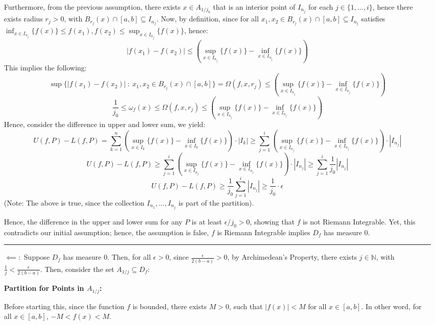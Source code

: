 \documentclass{article}
\begin{document}
\begin{itemize}
    Furthermore, from the previous assumption, there exists $x\in A_{1/j_0}$ that is an interior point of $I_{n_j}$ for each $j\in\{1,...,i\}$,
    hence there exists radius $r_j>0$, with $B_{r_j}(x)\cap [a,b]\subseteq I_{n_j}$.
    Now, by definition, since for all $x_1,x_2\in B_{r_j}(x)\cap [a,b]\subseteq I_{n_j}$ satisfies $\inf_{x\in I_{n_j}}\{f(x)\}\leq f(x_1),f(x_2)\leq \sup_{x\in I_{n_j}}\{f(x)\}$, hence:
    $$|f(x_1)-f(x_2)|\leq \left(\sup_{x\in I_{n_j}}\{f(x)\}-\inf_{x\in I_{n_j}}\{f(x)\}\right)$$
    This implies the following: 
    $$\sup\{|f(x_1)-f(x_2)|\ :\ x_1,x_2\in B_{r_j}(x)\cap [a,b]\}=\Omega(f,x,r_j)\leq \left(\sup_{x\in I_{n_j}}\{f(x)\}-\inf_{x\in I_{n_j}}\{f(x)\}\right)$$
    $$\frac{1}{j_0}\leq \omega_f(x)\leq \Omega(f,x,r_j)\leq \left(\sup_{x\in I_{n_j}}\{f(x)\}-\inf_{x\in I_{n_j}}\{f(x)\}\right)$$
    Hence, consider the difference in upper and lower sum, we yield:
    $$U(f,P)-L(f,P)=\sum_{k=1}^{n}\left(\sup_{x\in I_{k}}\{f(x)\}-\inf_{x\in I_{k}}\{f(x)\}\right)\cdot |I_k| \geq \sum_{j=1}^{i}\left(\sup_{x\in I_{n_j}}\{f(x)\}-\inf_{x\in I_{n_j}}\{f(x)\}\right)\cdot |I_{n_j}|$$
    $$U(f,P)-L(f,P)\geq \sum_{j=1}^{i}\left(\sup_{x\in I_{n_j}}\{f(x)\}-\inf_{x\in I_{n_j}}\{f(x)\}\right)\cdot |I_{n_j}| \geq \sum_{j=1}^{i}\frac{1}{j_0}|I_{n_j}|$$
    $$U(f,P)-L(f,P)\geq \frac{1}{j_0}\sum_{j=1}^{i}|I_{n_j}| \geq \frac{1}{j_0}\cdot\epsilon$$
    (Note: The above is true, since the collection $I_{n_1},...,I_{n_j}$ is part of the partition).

    Hence, the difference in the upper and lower sum for any $P$ is at least $\epsilon/j_0>0$, showing that $f$ is not Riemann Integrable.
    Yet, this contradicts our initial assumption; hence, the assumption is false, $f$ is Riemann Integrable implies $D_f$ has measure $0$.
    
    \hfill

    \rule{155mm}{0.1mm}

    \hfill

    \item[$\impliedby:$] Suppose $D_f$ has measure $0$. Then, for all $\epsilon>0$, since $\frac{\epsilon}{2(b-a)}>0$, by Archimedean's Property, there exists $j\in\mathbb{N}$, with $\frac{1}{j}<\frac{\epsilon}{2(b-a)}$.
    Then, consider the set $A_{1/j}\subseteq D_f$:
    
    \hfill

    \textbf{Partition for Points in $A_{1/j}$:}

    Before starting this, since the function $f$ is bounded, there exists $M>0$, such that $|f(x)|<M$ for all $x\in[a,b]$. In other word, for all $x\in[a,b]$,
    $-M<f(x)<M$.


\end{itemize}
\end{document}
